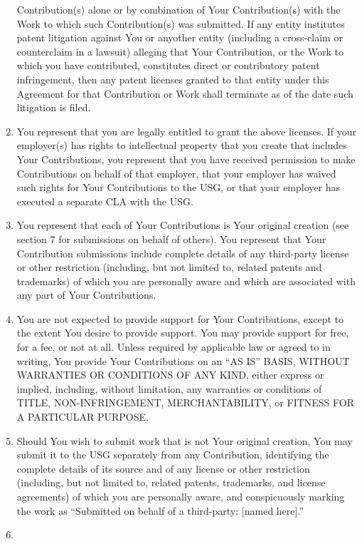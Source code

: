 \begin{enumerate}
  Contribution(s) alone or by combination of Your Contribution(s) with
  the Work to which such Contribution(s) was submitted. If any entity
  institutes patent litigation against You or anyother entity (including
  a cross-claim or counterclaim in a lawsuit) alleging that Your
  Contribution, or the Work to which you have contributed, constitutes
  direct or contributory patent infringement, then any patent licenses
  granted to that entity under this Agreement for that Contribution or
  Work shall terminate as of the date such litigation is filed.
\item
  You represent that you are legally entitled to grant the above
  licenses. If your employer(s) has rights to intellectual property that
  you create that includes Your Contributions, you represent that you
  have received permission to make Contributions on behalf of that
  employer, that your employer has waived such rights for Your
  Contributions to the USG, or that your employer has executed a
  separate CLA with the USG.
\item
  You represent that each of Your Contributions is Your original
  creation (see section 7 for submissions on behalf of others). You
  represent that Your Contribution submissions include complete details
  of any third-party license or other restriction (including, but not
  limited to, related patents and trademarks) of which you are
  personally aware and which are associated with any part of Your
  Contributions.
\item
  You are not expected to provide support for Your Contributions, except
  to the extent You desire to provide support. You may provide support
  for free, for a fee, or not at all. Unless required by applicable law
  or agreed to in writing, You provide Your Contributions on an ``AS
  IS'' BASIS, WITHOUT WARRANTIES OR CONDITIONS OF ANY KIND, either
  express or implied, including, without limitation, any warranties or
  conditions of TITLE, NON-INFRINGEMENT, MERCHANTABILITY, or FITNESS FOR
  A PARTICULAR PURPOSE.
\item
  Should You wish to submit work that is not Your original creation, You
  may submit it to the USG separately from any Contribution, identifying
  the complete details of its source and of any license or other
  restriction (including, but not limited to, related patents,
  trademarks, and license agreements) of which you are personally aware,
  and conspicuously marking the work as ``Submitted on behalf of a
  third-party: {[}named here{]}.''
\item

\end{enumerate}
